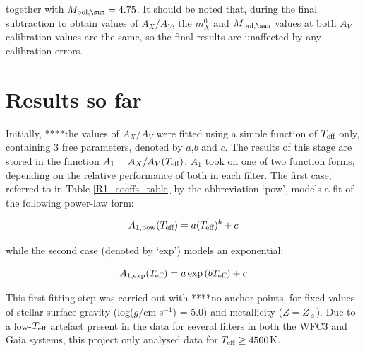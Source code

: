 \documentclass[usenatbib]{mnras}
\begin{document}
together with $M_{\textnormal{bol},\sun} = 4.75$. It should be noted that, during the final subtraction to obtain values of $A_{X}/A_{V}$, the $m_{X}^{0}$ and $M_{\textnormal{bol},\sun}$ values at both $A_{V}$ calibration values are the same, so the final results are unaffected by any calibration errors.

\section{Results so far}

Initially, ****the values of $A_{X}/A_{V}$ were fitted using a simple function of $T_{\textnormal{eff}}$ only, containing 3 free parameters, denoted by $a$,$b$ and $c$. The results of this stage are stored in the function $A_{1} = A_{X}/A_{V}(T_{\textnormal{eff}})$. $A_{1}$ took on one of two function forms, depending on the relative performance of both in each filter. The first case, referred to in Table \ref{R1_coeffs_table} by the abbreviation `pow', models a fit of the following power-law form:

\begin{equation}
A_{1,\textnormal{pow}} (T_{\textnormal{eff}}) = a (T_{\textnormal{eff}})^{b} + c
\label{Teff_pow}
\end{equation}

while the second case (denoted by `exp') models an exponential:

\begin{equation}
A_{1,\textnormal{exp}} (T_{\textnormal{eff}}) = a \exp{(b T_{\textnormal{eff}})} + c
\label{Teff_exp}
\end{equation}

This first fitting step was carried out with ****no anchor points, for  fixed values of stellar surface gravity (log($g$/cm s$^{-1}$) = 5.0) and metallicity ($Z = Z_{\sun}$). Due to a low-$T_{\textnormal{eff}}$ artefact present in the data for several filters in both the WFC3 and Gaia systems, this project only analysed data for $T_{\textnormal{eff}} \geq 4500$K.
\end{document}

